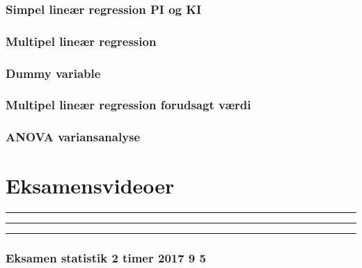 \documentclass[]{book}
\begin{document}
\hypertarget{simpel-liner-regression-pi-og-ki}{%
\subsubsection{Simpel lineær regression PI og KI}\label{simpel-liner-regression-pi-og-ki}}

\hypertarget{multipel-liner-regression}{%
\subsubsection{Multipel lineær regression}\label{multipel-liner-regression}}

\hypertarget{dummy-variable}{%
\subsubsection{Dummy variable}\label{dummy-variable}}

\hypertarget{multipel-liner-regression-forudsagt-vrdi}{%
\subsubsection{Multipel lineær regression forudsagt værdi}\label{multipel-liner-regression-forudsagt-vrdi}}

\hypertarget{anova-variansanalyse}{%
\subsubsection{ANOVA variansanalyse}\label{anova-variansanalyse}}

\hypertarget{eksamensvideoer}{%
\section{Eksamensvideoer}\label{eksamensvideoer}}

\begin{center}\rule{0.5\linewidth}{\linethickness}\end{center}

\begin{center}\rule{0.5\linewidth}{\linethickness}\end{center}

\begin{center}\rule{0.5\linewidth}{\linethickness}\end{center}

\hypertarget{eksamen-statistik-2-timer-2017-9-5}{%
\subsubsection{Eksamen statistik 2 timer 2017 9 5}\label{eksamen-statistik-2-timer-2017-9-5}}
\end{document}
